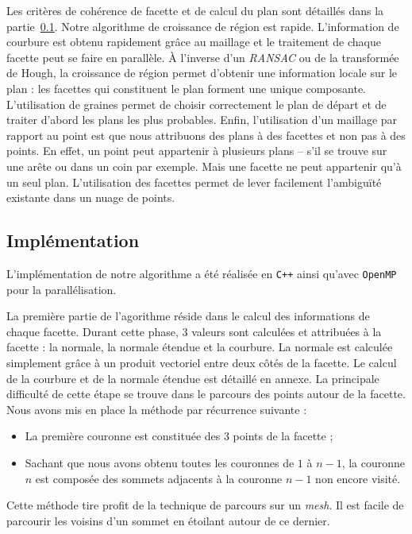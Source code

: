 \documentclass[12pt, twoside]{article}
\begin{document}
Les critères de cohérence de facette et de calcul du plan sont détaillés dans la partie~\ref{subsec:growthimpl}. Notre algorithme de croissance de région est rapide. L'information de courbure est obtenu rapidement grâce au maillage et le traitement de chaque facette peut se faire en parallèle. À l'inverse d'un \textit{RANSAC} ou de la transformée de Hough, la croissance de région permet d'obtenir une information locale sur le plan : les facettes qui constituent le plan forment une unique composante. L'utilisation de graines permet de choisir correctement le plan de départ et de traiter d'abord les plans les plus probables. Enfin, l'utilisation d'un maillage par rapport au point est que nous attribuons des plans à des facettes et non pas à des points. En effet, un point peut appartenir à plusieurs plans -- s'il se trouve sur une arête ou dans un coin par exemple. Mais une facette ne peut appartenir qu'à un seul plan. L'utilisation des facettes permet de lever facilement l'ambiguïté existante dans un nuage de points.

\subsection{Implémentation}
\label{subsec:growthimpl}
L'implémentation de notre algorithme a été réalisée en \texttt{C++} ainsi qu'avec \texttt{OpenMP} pour la parallélisation.

La première partie de l'agorithme réside dans le calcul des informations de chaque facette. Durant cette phase, 3 valeurs sont calculées et attribuées à la facette : la normale, la normale étendue et la courbure. La normale est calculée simplement grâce à un produit vectoriel entre deux côtés de la facette. Le calcul de la courbure et de la normale étendue est détaillé en annexe. La principale difficulté de cette étape se trouve dans le parcours des points autour de la facette. Nous avons mis en place la méthode par récurrence suivante :
\begin{itemize}
  \item La première couronne est constituée des 3 points de la facette ;
  \item Sachant que nous avons obtenu toutes les couronnes de $1$ à $n-1$, la couronne $n$ est composée des sommets adjacents à la couronne $n-1$ non encore visité.
\end{itemize}
Cette méthode tire profit de la technique de parcours sur un \textit{mesh}. Il est facile de parcourir les voisins d'un sommet en étoilant autour de ce dernier.
\end{document}
